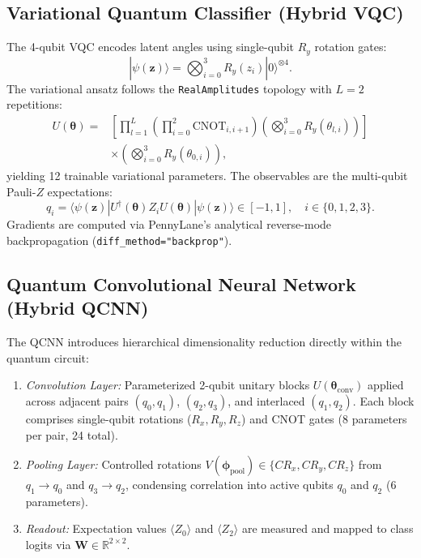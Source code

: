 \documentclass[conference]{IEEEtran}
\begin{document}
\subsection{Variational Quantum Classifier (Hybrid VQC)}
The 4-qubit VQC encodes latent angles using single-qubit $R_y$ rotation gates:
\begin{equation}
|\psi(\mathbf{z})\rangle = \bigotimes_{i=0}^{3} R_y(z_i) |0\rangle^{\otimes 4}.
\end{equation}
The variational ansatz follows the \texttt{RealAmplitudes} topology with $L=2$ repetitions:
\begin{align}
U(\boldsymbol{\theta}) = &\left[ \prod_{l=1}^{L} \left( \prod_{i=0}^{2} \text{CNOT}_{i, i+1} \right) \left( \bigotimes_{i=0}^{3} R_y(\theta_{l, i}) \right) \right] \nonumber \\
&\times \left( \bigotimes_{i=0}^{3} R_y(\theta_{0, i}) \right),
\end{align}
yielding 12 trainable variational parameters. The observables are the multi-qubit Pauli-$Z$ expectations:
\begin{equation}
q_i = \langle \psi(\mathbf{z}) | U^\dagger(\boldsymbol{\theta}) Z_i U(\boldsymbol{\theta}) | \psi(\mathbf{z}) \rangle \in [-1, 1], \quad i \in \{0, 1, 2, 3\}.
\end{equation}
Gradients are computed via PennyLane's analytical reverse-mode backpropagation (\texttt{diff\_method="backprop"}).

\subsection{Quantum Convolutional Neural Network (Hybrid QCNN)}
The QCNN introduces hierarchical dimensionality reduction directly within the quantum circuit:
\begin{enumerate}
    \item \textit{Convolution Layer:} Parameterized 2-qubit unitary blocks $U(\boldsymbol{\theta}_{\text{conv}})$ applied across adjacent pairs $(q_0, q_1)$, $(q_2, q_3)$, and interlaced $(q_1, q_2)$. Each block comprises single-qubit rotations ($R_x, R_y, R_z$) and CNOT gates (8 parameters per pair, 24 total).
    \item \textit{Pooling Layer:} Controlled rotations $V(\boldsymbol{\phi}_{\text{pool}}) \in \{CR_x, CR_y, CR_z\}$ from $q_1 \to q_0$ and $q_3 \to q_2$, condensing correlation into active qubits $q_0$ and $q_2$ (6 parameters).
    \item \textit{Readout:} Expectation values $\langle Z_0 \rangle$ and $\langle Z_2 \rangle$ are measured and mapped to class logits via $\mathbf{W} \in \mathbb{R}^{2 \times 2}$.
\end{enumerate}
\end{document}
